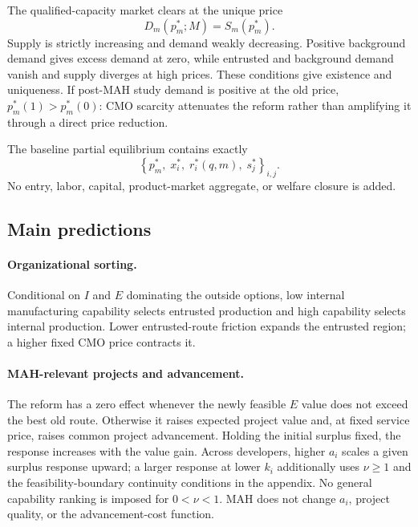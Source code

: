 \documentclass[11pt]{article}
\begin{document}
The qualified-capacity market clears at the unique price
\begin{equation}
  D_m(p_m^*;M)=S_m(p_m^*).
  \label{eq:p16m-clearing}
\end{equation}
Supply is strictly increasing and demand weakly decreasing. Positive
background demand gives excess demand at zero, while entrusted and
background demand vanish and supply diverges at high prices. These conditions
give existence and uniqueness. If post-MAH study demand is positive at the
old price, \(p_m^*(1)>p_m^*(0)\): CMO scarcity attenuates the reform rather
than amplifying it through a direct price reduction.

The baseline partial equilibrium contains exactly
\begin{equation}
  \left\{
  p_m^*,\;
  x_i^*,\;
  r_i^*(q,m),\;
  s_j^*
  \right\}_{i,j}.
  \label{eq:p16m-equilibrium}
\end{equation}
No entry, labor, capital, product-market aggregate, or welfare closure is
added.

\subsection{Main predictions}
\label{subsec:p16m-predictions}

\paragraph{Organizational sorting.}
Conditional on \(I\) and \(E\) dominating the outside options, low internal
manufacturing capability selects entrusted production and high capability
selects internal production. Lower entrusted-route friction expands the
entrusted region; a higher fixed CMO price contracts it.

\paragraph{MAH-relevant projects and advancement.}
The reform has a zero effect whenever the newly feasible \(E\) value does not
exceed the best old route. Otherwise it raises expected project value and,
at fixed service price, raises common project advancement. Holding the initial surplus fixed, the response increases with the value gain.
Across developers, higher \(a_i\) scales a given surplus response upward;
a larger response at lower \(k_i\) additionally uses \(\nu\geq1\) and the
feasibility-boundary continuity conditions in the appendix. No general
capability ranking is imposed for \(0<\nu<1\). MAH does not change
\(a_i\), project quality, or the advancement-cost function.
\end{document}
